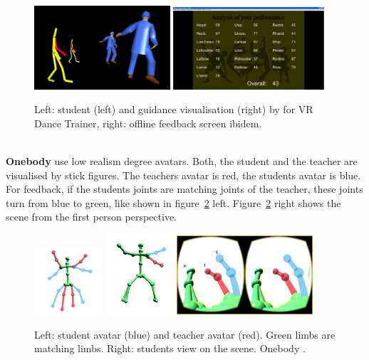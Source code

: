 \begin{figure}
	\centering
	\includegraphics[width=0.45\textwidth]{img/VRDanceTrainerPractice.png}
	\includegraphics[width=0.5\textwidth]{img/VRDanceTrainerScoreBoard.png}
	\caption{Left: student (left) and guidance visualisation (right) by \cite{Chan2010} for VR Dance Trainer, right: offline feedback screen ibidem.}
	\label{fig:vrdt}
\end{figure}
$ $\\
\textbf{Onebody} \cite{Hoang2016} use low realism degree avatars. Both, the student and the teacher are visualised by stick figures. The teachers avatar is red, the students avatar is blue. For feedback, if the students joints are matching joints of the teacher, these joints turn from blue to green, like shown in figure~\ref{fig:ob1} left. Figure~\ref{fig:ob1} right shows the scene from the first person perspective.
\begin{figure}
	\centering
	\includegraphics[width=0.225\textwidth]{img/onebody1.png}
	\includegraphics[width=0.225\textwidth]{img/onebody2.png}
	\includegraphics[width=0.45\textwidth]{img/onebody3.png}
	\caption{Left: student avatar (blue) and teacher avatar (red). Green limbs are matching limbs. Right: students view on the scene. Onebody \cite{Hoang2016}.}
	\label{fig:ob1}
\end{figure}
